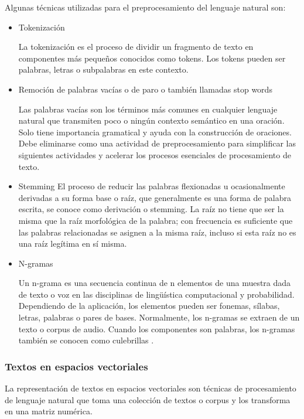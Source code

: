 \documentclass[12pt]{article}
\begin{document}
			Algunas técnicas utilizadas para el preprocesamiento del lenguaje natural  son:
			
			\begin{itemize}
			\item Tokenización
			
			La tokenización es el proceso de dividir un fragmento de texto en componentes más pequeños conocidos como tokens. Los tokens pueden ser palabras, letras o subpalabras en este contexto. \cite{Senanayake2019}
			
			\item Remoción de palabras vacías o de paro o también llamadas stop words
			
			Las palabras vacías son los términos más comunes en cualquier lenguaje natural que transmiten poco o ningún contexto semántico en una oración. Solo tiene importancia gramatical y ayuda con la construcción de oraciones. Debe eliminarse como una actividad de preprocesamiento para simplificar las siguientes actividades y acelerar los procesos esenciales de procesamiento de texto.\cite{Raulji2016}
			
			\item Stemming
			El proceso de reducir las palabras flexionadas u ocasionalmente derivadas a su forma base o raíz, que generalmente es una forma de palabra escrita, se conoce como derivación o stemming. La raíz no tiene que ser la misma que la raíz morfológica de la palabra; con frecuencia es suficiente que las palabras relacionadas se asignen a la misma raíz, incluso si esta raíz no es una raíz legítima en sí misma.\cite{Gupta2013}
			
			\item N-gramas
			
			Un n-grama es una secuencia continua de n elementos de una muestra dada de texto o voz en las disciplinas de lingüística computacional y probabilidad. Dependiendo de la aplicación, los elementos pueden ser fonemas, sílabas, letras, palabras o pares de bases. Normalmente, los n-gramas se extraen de un texto o corpus de audio. Cuando los componentes son palabras, los n-gramas también se conocen como culebrillas \cite{Broder1997}.			
			
			\end{itemize}
						
			
			\subsubsection{Textos en espacios vectoriales}
			La representación de textos en espacios vectoriales son técnicas de procesamiento de lenguaje natural que toma una colección de textos o corpus y los transforma en una matriz numérica. \cite{Shahmirzadi2018}
				
\end{document}
